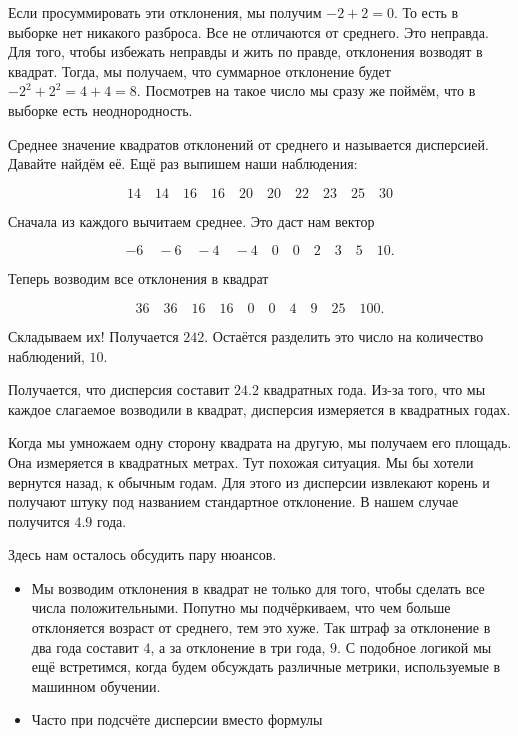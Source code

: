 \documentclass[12pt, a4paper, oneside]{article}
\begin{document}
\begin{enumerate}
Если просуммировать эти отклонения, мы получим $-2 + 2 = 0$. То есть в выборке нет никакого разброса. Все не отличаются от среднего. Это неправда. Для того, чтобы избежать неправды и жить по правде, отклонения возводят в квадрат. Тогда, мы получаем, что суммарное отклонение будет $-2^2 + 2^2 = 4 + 4 = 8$. Посмотрев на такое число мы сразу же поймём, что в выборке есть неоднородность. 

Среднее значение квадратов отклонений от среднего и называется дисперсией. Давайте найдём её. Ещё раз выпишем наши наблюдения: 

\[
14 \quad 14  \quad 16  \quad 16  \quad 20  \quad 20  \quad 22  \quad 23  \quad 25  \quad 30
\]

Сначала из каждого вычитаем среднее. Это даст нам вектор 

\[
-6 \quad -6  \quad -4  \quad -4  \quad 0  \quad 0 \quad 2  \quad 3  \quad 5  \quad 10.
\]

Теперь возводим все отклонения в квадрат

\[
36 \quad 36  \quad 16  \quad 16 \quad 0  \quad 0 \quad 4  \quad 9 \quad 25  \quad 100.
\]

Складываем их! Получается $242$. Остаётся разделить это число на количество наблюдений, $10$.

Получается, что дисперсия составит $24.2$ квадратных года.  Из-за того, что мы каждое слагаемое возводили в квадрат, дисперсия измеряется в квадратных годах.  

Когда мы умножаем одну сторону квадрата на другую, мы получаем его площадь. Она измеряется в квадратных метрах. Тут похожая ситуация. Мы бы хотели вернутся назад, к обычным годам. Для этого из дисперсии извлекают корень и получают штуку под названием стандартное отклонение.  В нашем случае получится $4.9$ года. 

Здесь нам осталось обсудить пару нюансов. 

\begin{itemize}
	\item  Мы возводим отклонения в квадрат не только для того, чтобы сделать все числа положительными. Попутно мы подчёркиваем, что чем больше отклоняется возраст от среднего, тем это хуже. Так штраф за отклонение в два года составит $4$, а за отклонение в три года, $9$.  С подобное логикой мы ещё встретимся, когда будем обсуждать различные метрики, используемые в машинном обучении. 
	
	\item Часто при подсчёте дисперсии вместо формулы 
	

\end{itemize}
\end{enumerate}
\end{document}
